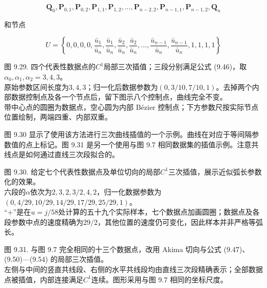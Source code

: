 \documentclass[../main.tex]{subfiles}
\begin{document}
\[
{\mathbf{Q}}_{0},{\mathbf{P}}_{0,1},{\mathbf{P}}_{0,2},{\mathbf{P}}_{1,1},{\mathbf{P}}_{1,2},\ldots ,{\mathbf{P}}_{n - 2,2},{\mathbf{P}}_{n - 1,1},{\mathbf{P}}_{n - 1,2},{\mathbf{Q}}_{n} \tag{9.53}
\]

和节点

\[
U = \left\{  {0,0,0,0,\frac{{\bar{u}}_{1}}{{\bar{u}}_{n}},\frac{{\bar{u}}_{1}}{{\bar{u}}_{n}},\frac{{\bar{u}}_{2}}{{\bar{u}}_{n}},\frac{{\bar{u}}_{2}}{{\bar{u}}_{n}},\ldots ,\frac{{\bar{u}}_{n - 1}}{{\bar{u}}_{n}},\frac{{\bar{u}}_{n - 1}}{{\bar{u}}_{n}},1,1,1,1}\right\}   \tag{9.54}
\]

\begin{center}
\begin{minipage}{27cm}
\vspace*{.6\baselineskip}
\centering
{}
\par\smallskip
图 9.29. 四个代表性数据点的$C^1$局部三次插值；三段分别满足公式 (9.46)，取$\alpha_0,\alpha_1,\alpha_2=3,4,3$。\\
原始参数区间长度为$3,4,3$；归一化后数据参数为$(0,3/10,7/10,1)$。去掉两个内部数据控制点及各一个节点后，留下图示八个控制点，曲线完全不变。\\
带中心点的圆圈为数据点，空心圆为内部 Bézier 控制点；下方参数尺按实际节点位置绘制，两端四重、内部双重。
\end{minipage}
\end{center}

图 9.30 显示了使用该方法进行三次曲线插值的一个示例。曲线在对应于等间隔参数值的点上标记。图 9.31 是另一个使用与图 9.7 相同数据集的插值示例。注意共线点是如何通过直线三次段拟合的。


\begin{center}
\begin{minipage}{29cm}
\vspace*{.6\baselineskip}
\centering
{}
\par\smallskip
图 9.30. 给定七个代表性数据点及单位切向的局部$C^1$三次插值，展示近似弧长参数化的效果。\\
六段的$\alpha$依次为$2,3,2,3/2,4,2$，归一化数据参数为$(0,4/29,10/29,14/29,17/29,25/29,1)$。\\
“$+$”是在$u=j/58$处计算的五十九个实际样本，七个数据点加画圆圈；数据点及各段参数中点的速度精确为$29/2$，其他位置的速度仍可变化，因此样本并非严格等弧长。
\end{minipage}
\end{center}

\begin{center}
\begin{minipage}{27cm}
\vspace*{.6\baselineskip}
\centering
{}
\par\smallskip
图 9.31. 与图 9.7 完全相同的十三个数据点，改用 Akima 切向与公式 (9.47)、(9.50)—(9.54) 的局部三次插值。\\
左侧与中间的竖直共线段、右侧的水平共线段均由直线三次段精确表示；全部数据点被插值，内部连接满足$C^1$连续。图形采用与图 9.7 相同的坐标尺度。
\end{minipage}
\end{center}
\end{document}
